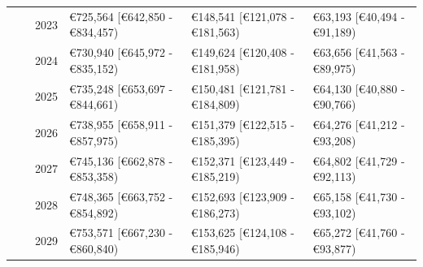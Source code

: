 \documentclass[
]{article}
\begin{document}
\begin{landscape}
\begin{longtable}[t]{llrlll}
\cmidrule{3-6}\nopagebreak
\hspace{1em} &  & 2023 & €725,564 [€642,850 - €834,457) & €148,541 [€121,078 - €181,563) & €63,193 [€40,494 - €91,189)\\
\cmidrule{3-6}\nopagebreak
\hspace{1em} &  & 2024 & €730,940 [€645,972 - €835,152) & €149,624 [€120,408 - €181,958) & €63,656 [€41,563 - €89,975)\\
\cmidrule{3-6}\nopagebreak
\hspace{1em} &  & 2025 & €735,248 [€653,697 - €844,661) & €150,481 [€121,781 - €184,809) & €64,130 [€40,880 - €90,766)\\
\cmidrule{3-6}\nopagebreak
\hspace{1em} &  & 2026 & €738,955 [€658,911 - €857,975) & €151,379 [€122,515 - €185,395) & €64,276 [€41,212 - €93,208)\\
\cmidrule{3-6}\nopagebreak
\hspace{1em} &  & 2027 & €745,136 [€662,878 - €853,358) & €152,371 [€123,449 - €185,219) & €64,802 [€41,729 - €92,113)\\
\cmidrule{3-6}\nopagebreak
\hspace{1em} &  & 2028 & €748,365 [€663,752 - €854,892) & €152,693 [€123,909 - €186,273) & €65,158 [€41,730 - €93,102)\\
\cmidrule{3-6}\nopagebreak
\hspace{1em} &  & 2029 & €753,571 [€667,230 - €860,840) & €153,625 [€124,108 - €185,946) & €65,272 [€41,760 - €93,877)\\*
\end{longtable}
\endgroup{}
\end{landscape}
\end{document}
